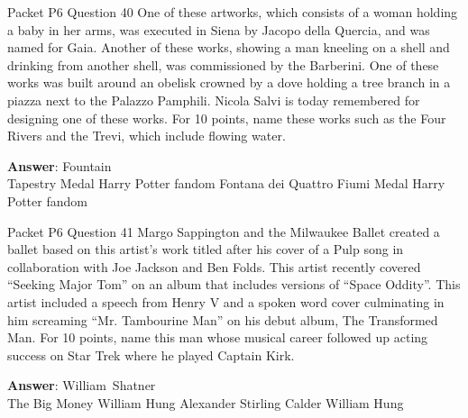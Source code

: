 \begin{frame}{Packet P6 Question 40}
One of these artworks,     which consists of a woman holding a baby in her arms, was executed in Siena by Jacopo della Quercia, and was named for Gaia. Another of these works, showing a man kneeling on a shell and drinking from another shell, was commissioned by the Barberini. One of these works was built around an obelisk crowned   by a dove holding a tree branch in a piazza next to the Palazzo Pamphili. Nicola Salvi is today remembered for designing one of these works. For 10 points,   name these works such as the Four Rivers and the Trevi, which include flowing water.      

\textbf{Answer}: Fountain\\
 Tapestry
 Medal
 Harry Potter fandom
 Fontana dei Quattro Fiumi
 Medal
 Harry Potter fandom
\end{frame}

\begin{frame}{Packet P6 Question 41}
Margo Sappington and the   Milwaukee Ballet created a ballet based on this artist's work titled after his cover of a Pulp song in collaboration with Joe Jackson and Ben Folds. This artist recently covered ``Seeking Major Tom'' on an album that includes versions of ``Space Oddity''. This artist included a speech from Henry V and a spoken word cover culminating in him screaming ``Mr. Tambourine Man'' on his debut   album, The Transformed Man. For 10 points, name this man whose musical career followed up acting   success on Star Trek where he played Captain   Kirk.    

\textbf{Answer}: William\ Shatner\\
 The Big Money
 William Hung
 Alexander Stirling Calder
 William Hung
\end{frame}

